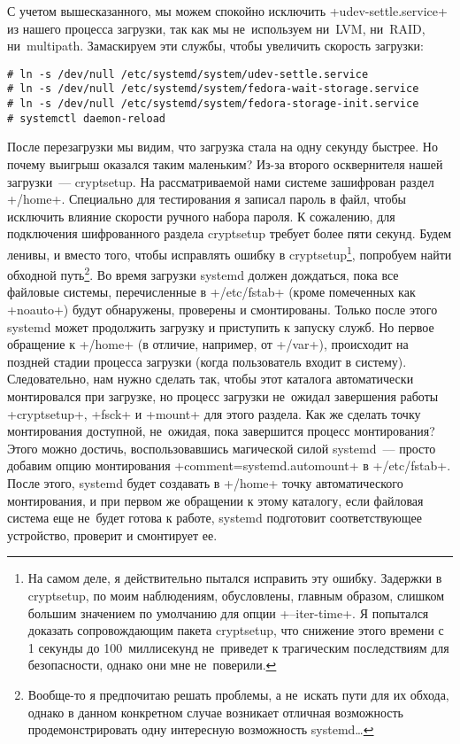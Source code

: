 \documentclass[10pt,oneside,a4paper]{article}
\begin{document}
С учетом вышесказанного, мы можем спокойно исключить +udev-settle.service+ из
нашего процесса загрузки, так как мы не~используем ни~LVM, ни~RAID,
ни~multipath. Замаскируем эти службы, чтобы увеличить скорость загрузки:
\begin{Verbatim}
# ln -s /dev/null /etc/systemd/system/udev-settle.service
# ln -s /dev/null /etc/systemd/system/fedora-wait-storage.service
# ln -s /dev/null /etc/systemd/system/fedora-storage-init.service
# systemctl daemon-reload
\end{Verbatim}

После перезагрузки мы видим, что загрузка стала на одну секунду быстрее. Но
почему выигрыш оказался таким маленьким? Из-за второго осквернителя нашей
загрузки~--- cryptsetup. На рассматриваемой нами системе зашифрован раздел
+/home+. Специально для тестирования я записал пароль в файл, чтобы исключить
влияние скорости ручного набора пароля. К сожалению, для подключения
шифрованного раздела cryptsetup требует более пяти секунд. Будем ленивы, и
вместо того, чтобы исправлять ошибку в cryptsetup\footnote{На самом деле, я
действительно пытался исправить эту ошибку. Задержки в cryptsetup, по
моим наблюдениям, обусловлены, главным образом, слишком большим значением по
умолчанию для опции +--iter-time+. Я попытался доказать сопровождающим пакета
cryptsetup, что снижение этого времени с 1 секунды до 100~миллисекунд
не~приведет к трагическим последствиям для безопасности, однако они мне
не~поверили.}, попробуем найти обходной путь\footnote{Вообще-то я предпочитаю
решать проблемы, а не~искать пути для их обхода, однако в данном конкретном
случае возникает отличная возможность продемонстрировать одну интересную
возможность systemd\ldots{}}. Во время загрузки systemd должен дождаться, пока
все файловые системы, перечисленные в +/etc/fstab+ (кроме помеченных как
+noauto+) будут обнаружены, проверены и смонтированы. Только после этого systemd
может продолжить загрузку и приступить к запуску служб. Но первое обращение
к +/home+ (в отличие, например, от +/var+), происходит на поздней стадии
процесса загрузки (когда пользователь входит в систему). Следовательно, нам
нужно сделать так, чтобы этот каталога автоматически монтировался при загрузке,
но процесс загрузки не~ожидал завершения работы +cryptsetup+, +fsck+ и +mount+
для этого раздела. Как же сделать точку монтирования доступной, не~ожидая, пока
завершится процесс монтирования? Этого можно достичь, воспользовавшись
магической силой systemd~--- просто добавим опцию монтирования
+comment=systemd.automount+ в +/etc/fstab+. После этого, systemd будет создавать
в +/home+ точку автоматического монтирования, и при первом же обращении к этому
каталогу, если файловая система еще не~будет готова к работе, systemd подготовит
соответствующее устройство, проверит и смонтирует ее.
\end{document}
